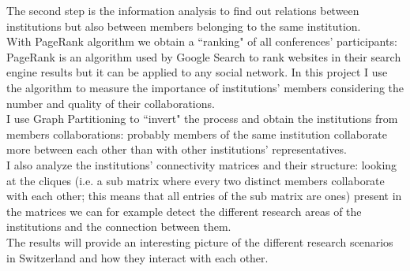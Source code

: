 \documentclass[12 pt]{article}
\begin{document}
The second step is the information analysis to find out relations between institutions but also between members belonging to the same institution.\\
With PageRank algorithm we obtain a ``ranking" of all conferences' participants: PageRank is an algorithm used by Google Search to rank websites in their search engine results but it can be applied to any social network. In this project I use the algorithm to measure the importance of institutions' members considering the number and quality of their collaborations.\\
I use Graph Partitioning to ``invert" the process and obtain the institutions from members collaborations: probably members of the same institution collaborate more between each other than with other institutions' representatives.\\
I also analyze the institutions' connectivity matrices and their structure: looking at the cliques (i.e. a sub matrix where every two distinct members collaborate with each other; this means that all entries of the sub matrix are ones) present in the matrices we can for example detect the different research areas of the institutions and the connection between them.\\
The results will provide an interesting picture of the different research scenarios in Switzerland and how they interact with each other.
\end{document}
